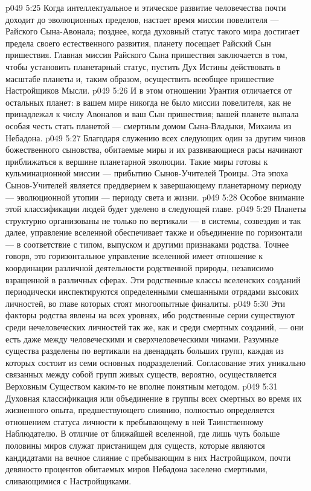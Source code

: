 \vs p049 5:25 Когда интеллектуальное и этическое развитие человечества почти доходит до эволюционных пределов, настает время миссии повелителя --- Райского Сына\hyp{}Авонала; позднее, когда духовный статус такого мира достигает предела своего естественного развития, планету посещает Райский Сын пришествия. Главная миссия Райского Сына пришествия заключается в том, чтобы установить планетарный статус, пустить Дух Истины действовать в масштабе планеты и, таким образом, осуществить всеобщее пришествие Настройщиков Мысли.
\vs p049 5:26 И в этом отношении Урантия отличается от остальных планет: в вашем мире никогда не было миссии повелителя, как не принадлежал к числу Авоналов и ваш Сын пришествия; вашей планете выпала особая честь стать планетой --- смертным домом Сына\hyp{}Владыки, Михаила из Небадона.
\vs p049 5:27 Благодаря служению всех следующих один за другим чинов божественного сыновства, обитаемые миры и их развивающиеся расы начинают приближаться к вершине планетарной эволюции. Такие миры готовы к кульминационной миссии --- прибытию Сынов\hyp{}Учителей Троицы. Эта эпоха Сынов\hyp{}Учителей является преддверием к завершающему планетарному периоду --- эволюционной утопии --- периоду света и жизни.
\vs p049 5:28 Особое внимание этой классификации людей будет уделено в следующей главе.
\vs p049 5:29 \pc {}\bibnobreakspace {} Планеты структурно организованы не только по вертикали --- в системы, созвездия и так далее, управление вселенной обеспечивает также и объединение по горизонтали --- в соответствие с типом, выпуском и другими признаками родства. Точнее говоря, это горизонтальное управление вселенной имеет отношение к координации различной деятельности родственной природы, независимо взращенной в различных сферах. Эти родственные классы вселенских созданий периодически инспектируются определенными смешанными отрядами высоких личностей, во главе которых стоят многоопытные финалиты.
\vs p049 5:30 Эти факторы родства явлены на всех уровнях, ибо родственные серии существуют среди нечеловеческих личностей так же, как и среди смертных созданий, --- они есть даже между человеческими и сверхчеловеческими чинами. Разумные существа разделены по вертикали на двенадцать больших групп, каждая из которых состоит из семи основных подразделений. Согласование этих уникально связанных между собой групп живых существ, вероятно, осуществляется Верховным Существом каким\hyp{}то не вполне понятным методом.
\vs p049 5:31 \pc {}\bibnobreakspace {} Духовная классификация или объединение в группы всех смертных во время их жизненного опыта, предшествующего слиянию, полностью определяется отношением статуса личности к пребывающему в ней Таинственному Наблюдателю. В отличие от ближайшей вселенной, где лишь чуть больше половины миров служат пристанищем для существ, которые являются кандидатами на вечное слияние с пребывающим в них Настройщиком, почти девяносто процентов обитаемых миров Небадона заселено смертными, сливающимися с Настройщиками.
